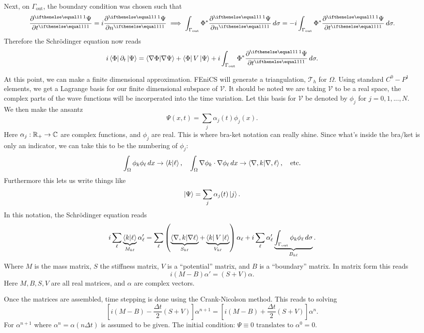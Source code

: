 \documentclass[../../main.tex]{subfiles}
\begin{document}
Next, on $\Gamma_\mathrm{out}$, the boundary condition was chosen 
such that 
\[
		\pder{\Psi}{t} = i \pder{\Psi}{n} \implies 
		\int_{\Gamma_\mathrm{out}} \Phi^* \pder{\Psi}{n} \, d\sigma = 
		-i \int_{\Gamma_\mathrm{out}} \Phi^* \pder{\Psi}{t} \, d\sigma
.\] 
Therefore the Schr\"odinger equation now reads
\[
		i \bra{\Phi} \partial_t \ket{\Psi} = 
		\bra{\nabla \Phi} \ket{\nabla \Psi} + 
		\bra{\Phi} V \ket{\Psi} + 
		i \int_{\Gamma_\mathrm{out}} \Phi^* \pder{\Psi}{t} \, d\sigma
.\] 

At this point, we can make a finite dimensional approximation.
FEniCS will generate a triangulation, $\mathcal T_h$ for 
$\Omega$.  
Using standard $C^0-P^1$ elements, 
we get a Lagrange basis for our finite dimensional subspace of 
$\mathcal V$.
It should be noted we are taking $\mathcal V$ to be a real space,
the complex parts of the wave functions will be incorperated into 
the time variation.
Let this basis for $\mathcal V$ be denoted by $\phi_j$ for $j = 0, 1, ..., N$. 
We then make the ansantz
\[
		\Psi(x, t) = \sum_j \alpha_j(t) \phi_j(x)
.\] 
Here $\alpha_j : \mathbb{R}_+ \to \mathbb{C}$ are complex functions, 
and $\phi_j$ are real.
This is where bra-ket notation can really shine.  
Since what's inside the bra/ket is only an indicator, we can take this
to be the numbering of $\phi_j$:
\[
  \int_\Omega \phi_k \phi_\ell \, dx \to 
  \bra{k} \ket{\ell}, \quad 
  \int_\Omega \nabla \phi_k \cdot \nabla \phi_\ell \, dx \to 
  \bra{\nabla, k} \ket{\nabla, \ell}, \quad \text{etc}
.\] 
Furthermore this lets us write things like
\[
		\ket{\Psi} = \sum_j \alpha_j(t) \ket{j}
.\] 
In this notation, the Schr\"odinger equation reads
\[
		i \sum_\ell \underbrace{\bra{k} \ket{\ell}}_{M_{k\ell}} \alpha_\ell' = 
		\sum_\ell \left(\underbrace{\bra{\nabla, k} \ket{\nabla \ell}}_{
				S_{k\ell}} + 
		\underbrace{\bra{k} V \ket{\ell}}_{V_{k\ell}}\right) \alpha_\ell + 
		i \sum_\ell \alpha_\ell' 
		\underbrace{
				\int_{\Gamma_\mathrm{out}} \phi_k \phi_\ell 
		\, d\sigma}_{B_{k\ell}}
.\] 
Where $M$ is the mass matrix, $S$ the stiffness matrix,
$V$ is a ``potential'' matrix, and $B$ is a ``boundary'' matrix.
In matrix form this reads
\[
		i (M - B) \alpha' = (S + V) \alpha
.\]
Here $M, B, S, V$ are all real matrices, and $\alpha$ are complex vectors.

Once the matrices are assembled, time stepping is done using the 
Crank-Nicolson method.  
This reads to solving
\[
		\left[i (M - B) - \frac{\Delta t}{2} (S + V)\right] \alpha^{n+1} = 
		\left[i (M - B) + \frac{\Delta t}{2} (S + V) \right] \alpha^n
.\] 
For $\alpha^{n+1}$ where $\alpha^n = \alpha(n \Delta t)$ is assumed to
be given.
The initial condition: $\Psi \equiv 0$ translates to 
$\alpha^0 = 0$.
\end{document}
